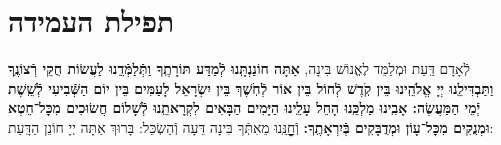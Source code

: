 \documentclass[twoside, openany, parskip=half, 11pt]{book}
\begin{document}
\clearpage

\barachu

\hamaarivaravim

\ahavasolam

\shema

\veahavta

\vehaya

\vayomer{}

\emesveemuna

\hashkiveinu

\boruchhashemleolam

\yerueinnu

\halfkaddish

\section*{ תפילת העמידה }

\amidaopening{\ayt}{}

\weekdaysakiddushhashem

לְֿאָדָם דַּֽעַת וּמְלַמֵּד לֶאֱנוֹשׁ בִּינָה,
\textbf{
אַתָּה חוֹנַנְתָּֽנוּ לְֿמַדַּע תּוֹרָתֶֽךָ וַתְּֿלַמְּֿדֵֽנוּ לַעֲשׂוֹת חֻקֵּי רְֿצוֹנֶֽךָ וַתַּבְדִּילֵֽנוּ יְיָ אֱלֹהֵֽינוּ בֵּין קֹֽדֶשׁ לְֿחוֹל בֵּין אוֹר לְֿחֹֽשֶׁךְ בֵּין יִשְׂרָאֵל לָעַמִּים בֵּין יוֹם הַשְּֿׁבִיעִי לְֿשֵֽׁשֶׁת יְֿמֵי הַמַּעֲשֶׂה: אָבִֽינוּ מַלְכֵּֽנוּ הָחֵל עָלֵֽינוּ הַיָּמִים הַבָּאִים לִקְרָאתֵֽנוּ לְֿשָׁלוֹם חֲשׂוּכִים מִכׇּל־חֵטְא וּמְנֻקִּים מִכׇּל־עָוֹן וּמְדֻבָּקִים בְּֿיִרְאָתֶֽךָ:
}
וְֿחׇׇׇׇׇׇׇׇָנֵּֽנוּ מֵאִתְּֿךָ בִּינָה דֵּעָה וְֿהַשְׂכֵּל: בָּרוּךְ אַתָּה יְיָ חוֹנֵן הַדָּֽעַת:

\weekdaysateshuva

\weekdaysaselichah

\weekdaysageulah

\weekdaysarefuah

\weekdaysaberacha

\weekdaysashofar

\weekdaysamishpat

\weekdaysaminim

\weekdaysatzadikim

\weekdaysayerushelayim

\weekdaysamalchus

\weekdaysashemakoleinu

\retzeh

\yaalehveyavo

\zion

\maarivmodim

\alhanisim
\end{document}
